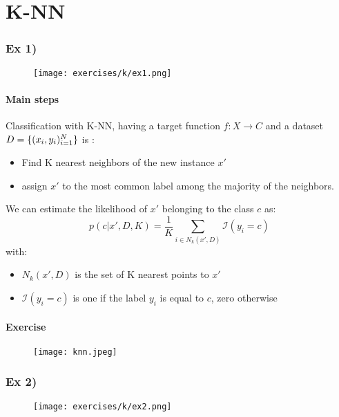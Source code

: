 \section{K-NN}

\subsubsection{Ex 1)}

\begin{figure}[H]
    \centering
    \texttt{[image: exercises/k/ex1.png]}
\end{figure}

\paragraph{Main steps}
Classification with K-NN, having a target function $f:X\rightarrow C$ and a dataset $D=\lbrace{(x_i,y_i)^N_{i=1}}\rbrace$ is :
\begin{itemize}
\item Find K nearest neighbors of the new instance $x'$
\item assign $x'$ to the most common label among the majority of the neighbors.
\end{itemize}
We can estimate the likelihood of $x'$ belonging to the class $c$ as:
$$p(c| x',D,K)=\frac{1}{K}\sum_{i \in N_k(x',D)}\mathcal{I}(y_i=c)$$
with:
\begin{itemize}
\item $ N_k(x',D)$ is the set of K nearest points to $x'$
\item $\mathcal{I}(y_i=c)$ is one if the label $y_i$ is equal to $c$, zero otherwise
\end{itemize}


\paragraph{Exercise}
\begin{figure}[H]
    \centering
    \texttt{[image: knn.jpeg]}
\end{figure}




\subsubsection{Ex 2)}
    \begin{figure}
       \centering

    \texttt{[image: exercises/k/ex2.png]}
\end{figure}

